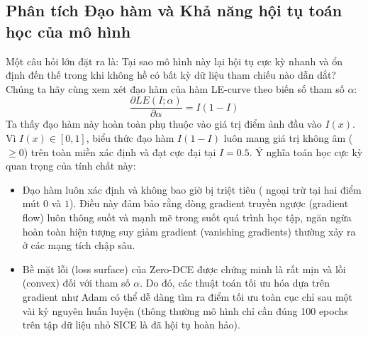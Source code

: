 \documentclass[a4paper]{article}
\begin{document}
\subsection{Phân tích Đạo hàm và Khả năng hội tụ toán học của mô hình}
Một câu hỏi lớn đặt ra là: Tại sao mô hình này lại hội tụ cực kỳ nhanh và ổn định đến thế trong khi không hề có bất kỳ dữ liệu tham chiếu nào dẫn dắt?
Chúng ta hãy cùng xem xét đạo hàm của hàm LE-curve theo biến số tham số $\alpha$:
\begin{equation}
    \frac{\partial LE(I; \alpha)}{\partial \alpha} = I(1 - I)
\end{equation}
Ta thấy đạo hàm này hoàn toàn phụ thuộc vào giá trị điểm ảnh đầu vào $I(x)$. Vì $I(x) \in [0, 1]$, biểu thức đạo hàm $I(1-I)$ luôn mang giá trị không âm ($\geq 0$) trên toàn miền xác định và đạt cực đại tại $I = 0.5$.
Ý nghĩa toán học cực kỳ quan trọng của tính chất này:
\begin{itemize}
    \item Đạo hàm luôn xác định và không bao giờ bị triệt tiêu ( ngoại trừ tại hai điểm mút $0$ và $1$). Điều này đảm bảo rằng dòng gradient truyền ngược (gradient flow) luôn thông suốt và mạnh mẽ trong suốt quá trình học tập, ngăn ngừa hoàn toàn hiện tượng suy giảm gradient (vanishing gradients) thường xảy ra ở các mạng tích chập sâu.

    \item Bề mặt lỗi (loss surface) của Zero-DCE được chứng minh là rất mịn và lồi (convex) đối với tham số $\alpha$. Do đó, các thuật toán tối ưu hóa dựa trên gradient như Adam có thể dễ dàng tìm ra điểm tối ưu toàn cục chỉ sau một vài kỷ nguyên huấn luyện (thông thường mô hình chỉ cần đúng 100 epochs trên tập dữ liệu nhỏ SICE là đã hội tụ hoàn hảo).
\end{itemize}
\end{document}
